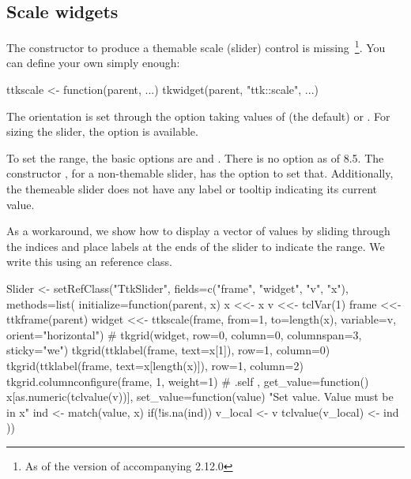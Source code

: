 \subsection{Scale widgets}
\label{sec:tcltk:scale-widgets}

The  constructor to produce a themable scale
(slider) control is missing~\footnote{As of the version of 
  accompanying \R{} 2.12.0}. You can define your own simply enough:
\begin{Schunk}
\begin{Sinput}
 ttkscale <- function(parent, ...) tkwidget(parent, "ttk::scale", ...)
\end{Sinput}
\end{Schunk}

The orientation is set through the option 
taking values of  (the default) or
. For sizing the slider, the 
option is available.  

To set the range, the basic options are  and
. There is no  option as of \TK\/
8.5. The constructor , for a non-themable slider,
has the option  to set that. Additionally,
the themeable slider does not have any label or tooltip indicating its
current value.


As a workaround, we show how to display a vector of values by
sliding through the indices and place labels at the ends of the slider
to indicate the range. We write this using an \R{} reference class.

\begin{Schunk}
\begin{Sinput}
 Slider <-
   setRefClass("TtkSlider",
               fields=c("frame", "widget", "v", "x"),
               methods=list(
                 initialize=function(parent, x) {
                   x <<- x
                   v <<- tclVar(1)
                   frame <<- ttkframe(parent)
                   widget <<- ttkscale(frame, from=1, to=length(x),
                                       variable=v, orient="horizontal")
                   #
                   tkgrid(widget, row=0, column=0, columnspan=3, sticky="we")
                   tkgrid(ttklabel(frame, text=x[1]), row=1, column=0)
                   tkgrid(ttklabel(frame, text=x[length(x)]), row=1, column=2)
                   tkgrid.columnconfigure(frame, 1, weight=1)
                   #
                   .self
                 },
                 get_value=function() x[as.numeric(tclvalue(v))],
                 set_value=function(value) {
                   "Set value. Value must be in x"
                   ind <- match(value, x)
                   if(!is.na(ind)) {
                     v_local <- v
                     tclvalue(v_local) <- ind
                   }
                 }
                 ))
\end{Sinput}
\end{Schunk}


